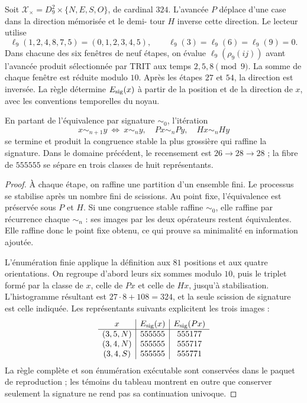 \begin{definition}
\label{def:firma555}
Soit \(\mathcal X_\times=D_9^2\times\{N,E,S,O\}\), de cardinal \(324\).
L'avancée \(P\) déplace d'une case dans la direction mémorisée et le demi-
tour \(H\) inverse cette direction. Le lecteur utilise
\[
\ell_9(1,2,4,8,7,5)=(0,1,2,3,4,5),\qquad
\ell_9(3)=\ell_9(6)=\ell_9(9)=0.
\]
Dans chacune des six fenêtres de neuf étapes, on évalue
\(\ell_9(\rho_9(ij))\) avant l'avancée produit sélectionnée par TRIT aux
temps \(2,5,8\pmod9\). La somme de chaque fenêtre est réduite modulo
\(10\). Après les étapes \(27\) et \(54\), la direction est inversée.
La règle détermine \(E_{\rm sig}(x)\) à partir de la position et de la direction
de \(x\), avec les conventions temporelles du noyau.
\end{definition}

\begin{proposition}
\label{prop:firma555}
En partant de l'équivalence par signature \(\sim_0\), l'itération
\[
x\sim_{n+1}y\ \Longleftrightarrow\
x\sim_n y,\quad Px\sim_n Py,\quad Hx\sim_n Hy
\]
se termine et produit la congruence stable la plus grossière qui raffine la signature. Dans le domaine précédent, le recensement est \(26\to28\to28\) ; la fibre de \(555555\) se sépare en trois classes de huit représentants.
\end{proposition}
\begin{proof}
À chaque étape, on raffine une partition d'un ensemble fini. Le processus se
stabilise après un nombre fini de scissions. Au point fixe,
l'équivalence est préservée sous \(P\) et \(H\). Si une congruence stable
raffine \(\sim_0\), elle raffine par récurrence chaque \(\sim_n\) : ses images
par les deux opérateurs restent équivalentes. Elle raffine donc le point
fixe obtenu, ce qui prouve sa minimalité en information ajoutée.

L'énumération finie applique la définition aux \(81\) positions et aux quatre orientations. On regroupe d'abord leurs six sommes modulo \(10\), puis le triplet formé par la classe de \(x\), celle de \(Px\) et celle de \(Hx\), jusqu'à stabilisation. L'histogramme résultant est \(27\cdot8+108=324\), et la seule scission de signature est celle indiquée. Les représentants suivants explicitent les trois images :
\[
\begin{array}{c|c|c}
x&E_{\rm sig}(x)&E_{\rm sig}(Px)\\\hline
(3,5,N)&555555&555177\\
(3,4,N)&555555&555717\\
(3,4,S)&555555&555771
\end{array}
\]
La règle complète et son énumération exécutable sont conservées dans le paquet
de reproduction ; les témoins du tableau montrent en outre que conserver
seulement la signature ne rend pas sa continuation univoque.
\end{proof}

